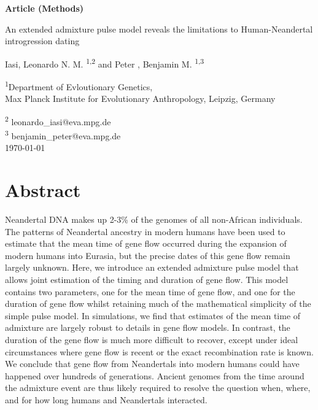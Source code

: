 \documentclass[11pt]{article}
\begin{document}
\begin{titlepage}

    \begin{flushright}
        \large
        \textbf{Article (Methods)}
    \end{flushright}


        \vspace*{1cm}
    \begin{center}       
        \Huge
        \vspace{1cm}
        An extended admixture pulse model reveals the limitations to Human-Neandertal introgression dating
        
        \vspace{1.0cm}
        \large
        Iasi, Leonardo N. M. \textsuperscript{1,2} and Peter , Benjamin M. \textsuperscript{1,3} \\ 
        
        \vspace{1.0cm}
        
        \textsuperscript{1}Department of Evloutionary Genetics, \\ 
        Max Planck Institute for Evolutionary Anthropology, Leipzig, Germany
        
        \vspace{1.0cm}
        \textsuperscript{2} leonardo\_iasi@eva.mpg.de \\ \textsuperscript{3} 
        benjamin\_peter@eva.mpg.de \\
        \vspace{1.0cm}
        \today
    \end{center}  
     

            

\end{titlepage}


\section{Abstract}\label{abstract}

Neandertal DNA makes up 2-3\% of the genomes of all non-African individuals. The patterns of Neandertal ancestry in modern humans have been used to estimate that the mean time of gene flow occurred during the expansion of modern humans into Eurasia, but the precise dates of this gene flow remain largely unknown. Here, we introduce an extended admixture pulse model that allows joint estimation of the timing and duration of gene flow. This model contains two parameters, one for the mean time of gene flow, and one for the duration of gene flow whilst retaining much of the mathematical simplicity of the simple pulse model. In simulations, we find that estimates of the mean time of admixture are largely robust to details in gene flow models. In contrast, the duration of the gene flow is much more difficult to recover, except under ideal circumstances where gene flow is recent or the exact recombination rate is known. We conclude that gene flow from Neandertals into modern humans could have happened over hundreds of generations. Ancient genomes from the time around the admixture event are thus likely required to resolve the question when, where, and for how long humans and Neandertals interacted.
\end{document}
